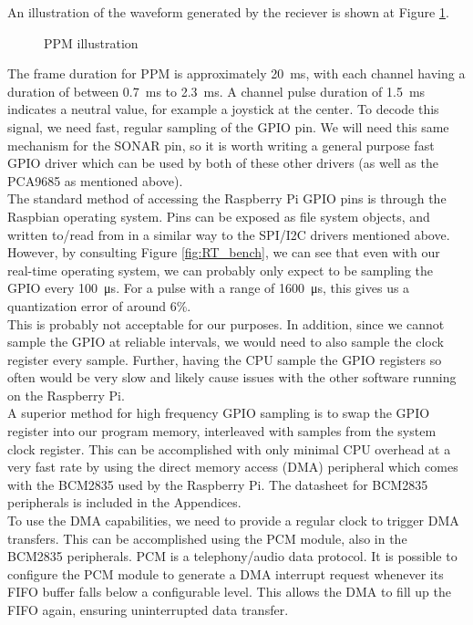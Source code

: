 \documentclass[capstone_report.tex]{subfiles}
\begin{document}
    An illustration of the waveform generated by the reciever is shown at Figure \ref{fig:ppm}.

    \begin{figure}[H]
    \centering
        
        \caption{PPM illustration\label{fig:ppm}}
    \end{figure}

    The frame duration for PPM is approximately \SI{20}{\milli\second}, with each channel having a duration of between \SI{0.7}{\milli\second} to \SI{2.3}{\milli\second}. A channel pulse duration of \SI{1.5}{\milli\second} indicates a neutral value, for example a joystick at the center. To decode this signal, we need fast, regular sampling of the GPIO pin. We will need this same mechanism for the SONAR pin, so it is worth writing a general purpose fast GPIO driver which can be used by both of these other drivers (as well as the PCA9685 as mentioned above).\\

    The standard method of accessing the Raspberry Pi GPIO pins is through the Raspbian operating system. Pins can be exposed as file system objects, and written to/read from in a similar way to the SPI/I2C drivers mentioned above. However, by consulting Figure \ref{fig:RT_bench}, we can see that even with our real-time operating system, we can probably only expect to be sampling the GPIO every \SI{100}{\micro\second}. For a pulse with a range of \SI{1600}{\micro\second}, this gives us a quantization error of around 6\%. \\

    This is probably not acceptable for our purposes. In addition, since we cannot sample the GPIO at reliable intervals, we would need to also sample the clock register every sample. Further, having the CPU sample the GPIO registers so often would be very slow and likely cause issues with the other software running on the Raspberry Pi.\\

    A superior method for high frequency GPIO sampling is to swap the GPIO register into our program memory, interleaved with samples from the system clock register. This can be accomplished with only minimal CPU overhead at a very fast rate by using the direct memory access (DMA) peripheral which comes with the BCM2835 used by the Raspberry Pi. The datasheet for BCM2835 peripherals is included in the Appendices.\\

    To use the DMA capabilities, we need to provide a regular clock to trigger DMA transfers. This can be accomplished using the PCM module, also in the BCM2835 peripherals. PCM is a telephony/audio data protocol. It is possible to configure the PCM module to generate a DMA interrupt request whenever its FIFO buffer falls below a configurable level. This allows the DMA to fill up the FIFO again, ensuring uninterrupted data transfer. \\  
\end{document}
